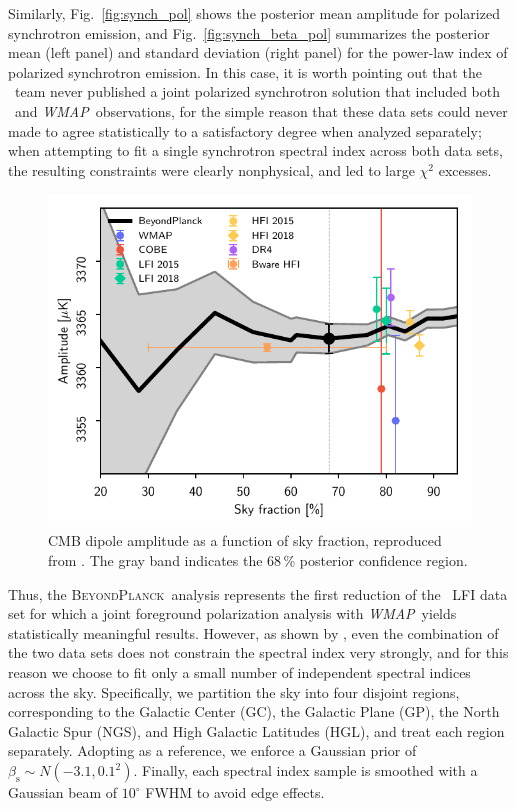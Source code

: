 \documentclass[onecolumn]{aa}
\def\WMAP{\emph{WMAP}}
\newcommand{\BP}{\textsc{BeyondPlanck}}
\begin{document}
Similarly, Fig.~\ref{fig:synch_pol} shows the posterior mean amplitude
for polarized synchrotron emission, and Fig.~\ref{fig:synch_beta_pol}
summarizes the posterior mean (left panel) and standard deviation
(right panel) for the power-law index of polarized synchrotron
emission. In this case, it is worth pointing out that the
\Planck\ team never published a joint polarized synchrotron solution
that included both \Planck\ and \WMAP\ observations, for the simple
reason that these data sets could never made to agree statistically to
a satisfactory degree when analyzed separately; when attempting to fit
a single synchrotron spectral index across both data sets, the
resulting constraints were clearly nonphysical, and led to large
$\chi^2$ excesses.

\begin{figure}[t]
  \center
  \includegraphics[width=0.5\linewidth]{figs/cmb_dipole_amplitude.pdf}
  \caption{CMB dipole amplitude as a function of sky fraction, reproduced from \citet{bp11}.
    The gray band indicates the 68\,\% posterior confidence region.}\label{fig:cmb_dipole}
\end{figure}

Thus, the \BP\ analysis represents the first reduction of the \Planck\ LFI
data set for which a joint foreground polarization analysis
with \WMAP\ yields statistically meaningful results. However, as shown
by \citet{bp14}, even the combination of the two data sets does not
constrain the spectral index very strongly, and for this reason we
choose to fit only a small number of independent spectral indices
across the sky. Specifically, we partition the sky into four disjoint
regions, corresponding to the Galactic Center (GC), the Galactic Plane
(GP), the North Galactic Spur (NGS), and High Galactic Latitudes
(HGL), and treat each region separately. Adopting
\citet{planck2014-a12} as a reference, we enforce a Gaussian prior of
$\beta_{\mathrm{s}}\sim N(-3.1,0.1^2)$. Finally, each spectral index
sample is smoothed with a Gaussian beam of $10^{\circ}$ FWHM to avoid
edge effects.
\end{document}
